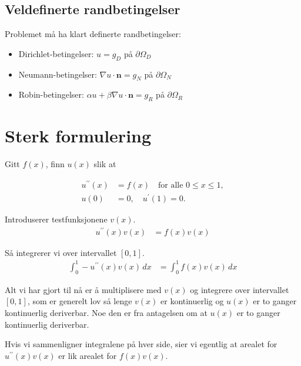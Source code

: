 \subsection{Veldefinerte randbetingelser}
Problemet må ha klart definerte randbetingelser:
\begin{itemize}
	\item Dirichlet-betingelser: \( u = g_D \) på \(\partial \Omega_D \)
	\item Neumann-betingelser: \( \nabla u \cdot \mathbf{n} = g_N \) på \(\partial \Omega_N \)
	\item Robin-betingelser: \( \alpha u + \beta \nabla u \cdot \mathbf{n} = g_R \) på \(\partial \Omega_R \)
\end{itemize}
\section{Sterk formulering}
Gitt $f(x)$, finn $u(x)$ slik at

\begin{align*}
	u^{\prime\prime}(x) & = f(x) \quad \text{for alle } 0 \leq x \leq 1, \\
	u(0)                & = 0,\quad u^{\prime}(1) = 0.
\end{align*}

Introduserer testfunksjonene $v(x)$.
\begin{align*}
	u^{\prime\prime}(x) v(x) & = f(x) v(x)
\end{align*}

Så integrerer vi over intervallet $[0,1]$.
\begin{align*}
	\int_0^1 -u^{\prime\prime}(x) v(x) \, dx & = \int_0^1 f(x) v(x) \, dx
\end{align*}

Alt vi har gjort til nå er å multiplisere med $v(x)$ og integrere over intervallet $[0,1]$, som er generelt lov så lenge $v(x)$ er kontinuerlig og $u(x)$ er to ganger kontinuerlig deriverbar.
Noe den er fra antagelsen om at $u(x)$ er to ganger kontinuerlig deriverbar.

Hvis vi sammenligner integralene på hver side, sier vi egentlig at arealet for $u^{\prime\prime}(x) v(x)$ er lik arealet for $f(x) v(x)$.

